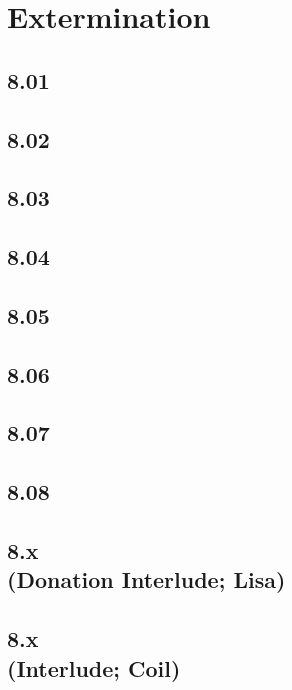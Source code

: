 \part{Extermination}
 \chapter{8.01}
 \chapter{8.02}
 \chapter{8.03}
 \chapter{8.04}
 \chapter{8.05}
 \chapter{8.06}
 \chapter{8.07}
 \chapter{8.08}
 \chapter[8.x (Donation Interlude; Lisa)]{8.x\\(Donation Interlude; Lisa)}
 \chapter[8.x (Interlude; Coil)]{8.x\\(Interlude; Coil)}











